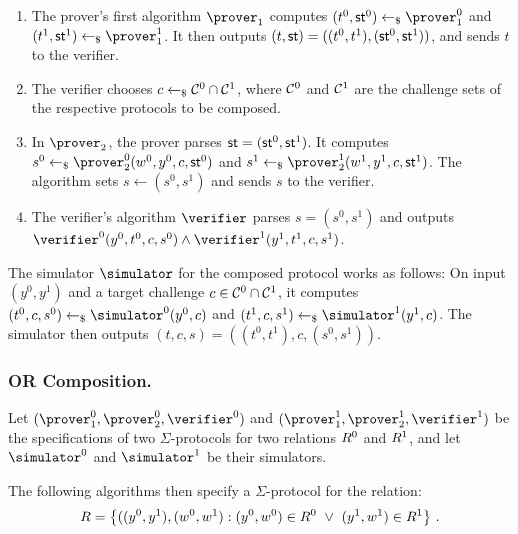 \documentclass[runningheads]{llncs}
\begin{document}
  \begin{enumerate}
    \item
      The prover's first algorithm $\prover_1$ computes $(t^0,\st^0)\getsr\prover_1^0$ and $(t^1,\st^1)\getsr\prover_1^1$.
      It then outputs $(t,\mathsf{st}) = ((t^0,t^1),(\mathsf{st}^0,\mathsf{st}^1))$, and sends $t$ to the verifier.
    \item
      The verifier chooses $c\gets_{\$}\mathcal{C}^0\cap\mathcal{C}^1$, where $\mathcal{C}^0$ and $\mathcal{C}^1$ are the challenge sets of the respective protocols to be composed.
    \item
      In $\prover_2$, the prover parses $\mathsf{st}=(\mathsf{st}^0,\mathsf{st}^1)$.
      It computes $s^0\getsr\prover_2^0(w^0,y^0,c,\st^0)$ and $s^1\getsr\prover_2^1(w^1,y^1,c,\st^1)$.
      The algorithm sets $s\gets(s^0,s^1)$ and sends $s$ to the verifier.
    \item
      The verifier's algorithm $\verifier$ parses $s=(s^0,s^1)$ and outputs $\verifier^0(y^0,t^0,c,s^0)\land\verifier^1(y^1,t^1,c,s^1)$. 
  \end{enumerate}

  The simulator $\simulator$ for the composed protocol works as follows:
  On input $(y^0,y^1)$ and a target challenge $c\in\mathcal{C}^0\cap\mathcal{C}^1$, it computes $(t^0,c,s^0)\getsr\simulator^0(y^0,c)$ and $(t^1,c,s^1)\getsr\simulator^1(y^1,c)$.
  The simulator then outputs $(t,c,s)=((t^0,t^1),c,(s^0,s^1))$.

\subsubsection{OR Composition.}
  Let $(\prover_1^0,\prover_2^0,\verifier^0)$ and $(\prover_1^1,\prover_2^1,\verifier^1)$ be the specifications of two $\Sigma$-protocols for two relations $R^0$ and $R^1$, and let $\simulator^0$ and $\simulator^1$ be their simulators.

  The following algorithms then specify a $\Sigma$-protocol for the relation:
$$
  R = \left\{ ((y^0,y^1),(w^0,w^1) : (y^0,w^0)\in R^0 ~\lor~ (y^1,w^1)\in R^1\right\}\,.
$$
\end{document}
